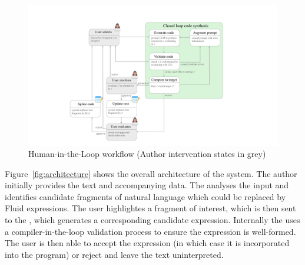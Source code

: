 \begin{figure}
    \centering
    \includegraphics[width=0.8\linewidth]{fig/interpretation-agent}
    \caption{Human-in-the-Loop \InterpretationAgent workflow (Author intervention states in grey)}
\end{figure}

Figure~\ref{fig:architecture} shows the overall architecture of the system. The author initially provides the
text and accompanying data. The \SuggestionAgent analyses the input and identifies candidate fragments of
natural language which could be replaced by Fluid expressions. The user highlightes a fragment of interest,
which is then sent to the \InterpretationAgent, which generates a corresponding candidate expression.
Internally the \InterpretationAgent uses a compiler-in-the-loop validation process to ensure the expression is
well-formed. The user is then able to accept the expression (in which case it is incorporated into the
program) or reject and leave the text uninterpreted.

